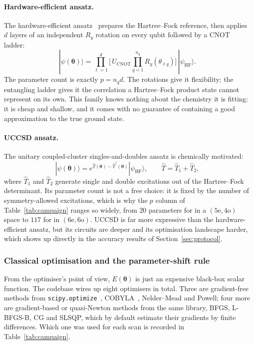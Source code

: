 \documentclass[sigconf,screen,nonacm]{acmart}
\begin{document}
\paragraph{Hardware-efficient ansatz.}
The hardware-efficient ansatz~\cite{kandala2017} prepares the Hartree--Fock
reference, then applies $d$ layers of an independent $R_y$ rotation on every
qubit followed by a CNOT ladder:
\begin{equation}
|\psi(\boldsymbol\theta)\rangle = \prod_{\ell=1}^{d}
\Big[\, U_{\text{CNOT}} \prod_{q=1}^{n_q} R_y(\theta_{\ell q}) \Big]
\,|\psi_{\text{HF}}\rangle .
\end{equation}
The parameter count is exactly $p = n_q d$. The rotations give it flexibility;
the entangling ladder gives it the correlation a Hartree--Fock product state
cannot represent on its own. This family knows nothing about the chemistry
it is fitting: it is cheap and shallow, and it comes with no guarantee of
containing a good approximation to the true ground state.

\paragraph{UCCSD ansatz.}
The unitary coupled-cluster singles-and-doubles ansatz is chemically
motivated:
\begin{equation}
|\psi(\boldsymbol\theta)\rangle
= e^{\hat{T}(\boldsymbol\theta)-\hat{T}^\dagger(\boldsymbol\theta)}
  |\psi_{\text{HF}}\rangle,
\qquad
\hat{T} = \hat{T}_1 + \hat{T}_2,
\end{equation}
where $\hat{T}_1$ and $\hat{T}_2$ generate single and double excitations out
of the Hartree--Fock determinant. Its parameter count is not a free choice:
it is fixed by the number of symmetry-allowed excitations, which is why the
$p$ column of Table~\ref{tab:campaign} ranges so widely, from $20$ parameters
for  in a $(5\text{e},4\text{o})$ space to $117$ for  in
$(6\text{e},6\text{o})$. UCCSD is far more expressive than the
hardware-efficient ansatz, but its circuits are deeper and its optimisation
landscape harder, which shows up directly in the accuracy results of
Section~\ref{sec:protocol}.

\subsubsection{Classical optimisation and the parameter-shift rule}

From the optimiser's point of view, $E(\boldsymbol\theta)$ is just an
expensive black-box scalar function. The codebase wires up eight optimisers
in total. Three are gradient-free methods from \texttt{scipy.optimize}~\cite{scipy},
COBYLA~\cite{powell1994}, Nelder--Mead and Powell; four more are gradient-based or
quasi-Newton methods from the same library, BFGS, L-BFGS-B, CG and SLSQP,
which by default estimate their gradients by finite differences. Which one
was used for each scan is recorded in Table~\ref{tab:campaign}.
\end{document}
